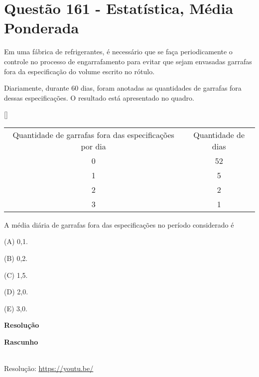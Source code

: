 \section{Questão 161 - Estatística, Média Ponderada}

Em uma fábrica de refrigerantes, é necessário que se faça periodicamente o controle no processo de engarrafamento para evitar que sejam envasadas garrafas fora da  especificação do volume escrito no rótulo.

Diariamente, durante 60 dias, foram anotadas as quantidades de garrafas fora dessas especificações. O resultado está apresentado no quadro.


\begin{center}[]
    \begin{tabular}{cc}
        \rowcolor[HTML]{BFBFBF} 
        {\color[HTML]{000000} Quantidade de garrafas fora das especificações por dia} & {\color[HTML]{000000} Quantidade de dias} \\
        {\color[HTML]{000000} 0}                                                      & {\color[HTML]{000000} 52}                 \\
        {\color[HTML]{000000} 1}                                                      & {\color[HTML]{000000} 5}                  \\
        {\color[HTML]{000000} 2}                                                      & {\color[HTML]{000000} 2}                  \\
        {\color[HTML]{000000} 3}                                                      & {\color[HTML]{000000} 1}                 
    \end{tabular}
\end{center}


A média diária de garrafas fora das especificações no período considerado é

(A)  0,1.

(B)  0,2.

(C)  1,5.

(D)  2,0.

(E)  3,0.

\textbf{Resolução}

\textbf{Rascunho}

\quad


\begin{center}
    \href{https://youtu.be/}{
    }\\
    Resolução: \url{https://youtu.be/}
\end{center}
